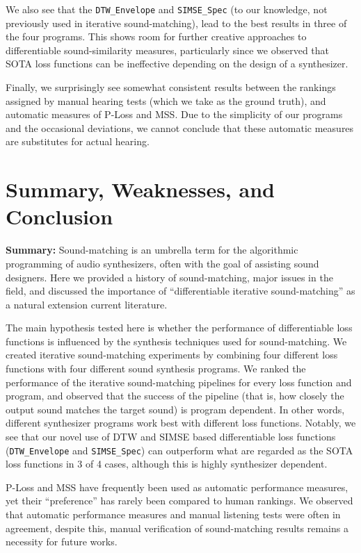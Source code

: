 \documentclass[lettersize,journal]{IEEEtran}
\newcommand{\SIMSESpec}{\texttt{SIMSE\_Spec}}
\newcommand{\DTWEnv}{\texttt{DTW\_Envelope}}
\begin{document}
We also see that the \DTWEnv{} and \SIMSESpec{} (to our knowledge, not previously used in iterative sound-matching), lead to the best results in three of the four programs. This shows room for further creative approaches to differentiable sound-similarity measures, particularly since we observed that SOTA loss functions can be ineffective depending on the design of a synthesizer. 

Finally, we surprisingly see somewhat consistent results between the rankings assigned by manual hearing tests (which we take as the ground truth), and automatic measures of P-Loss and MSS. Due to the simplicity of our programs and the occasional deviations, we cannot conclude that these automatic measures are substitutes for actual hearing.


\section{Summary, Weaknesses, and Conclusion}
\label{sec:summary_conclusion}
\textbf{Summary:} Sound-matching is an umbrella term for the algorithmic programming of audio synthesizers, often with the goal of assisting sound designers. Here we provided a history of sound-matching, major issues in the field, and discussed the importance of ``differentiable iterative sound-matching'' as a natural extension current literature.

The main hypothesis tested here is whether the performance of differentiable loss functions is influenced by the synthesis techniques used for sound-matching. We created iterative sound-matching experiments by combining four different loss functions with four different sound synthesis programs. We ranked the performance of the iterative sound-matching pipelines for every loss function and program, and observed that the success of the pipeline (that is, how closely the output sound matches the target sound) is program dependent. In other words, different synthesizer programs work best with different loss functions. Notably, we see that our novel use of DTW and SIMSE based differentiable loss functions (\DTWEnv{} and \SIMSESpec) can outperform what are regarded as the SOTA loss functions in 3 of 4 cases, although this is highly synthesizer dependent. 

P-Loss and MSS have frequently been used as automatic performance measures, yet their ``preference'' has rarely been compared to human rankings. We observed that automatic performance measures and manual listening tests were often in agreement, despite this, manual verification of sound-matching results remains a necessity for future works.  
\end{document}
